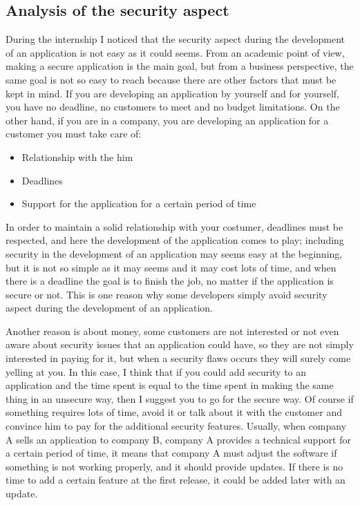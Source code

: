\subsection{Analysis of the security aspect}
During the internship I noticed that the security aspect during the development of an application is not easy as it could seems.\newline
From an academic point of view, making a secure application is the main goal, but from a business perspective, the same goal is not so easy to reach because there are other factors that must be kept in mind.\newline
If you are developing an application by yourself and for yourself, you have no deadline, no customers to meet and no budget limitations.\newline
On the other hand, if you are in a company, you are developing an application for a customer you must take care of:
\begin{itemize}
	\item Relationship with the him
	\item Deadlines
	\item Support for the application for a certain period of time
\end{itemize}

In order to maintain a solid relationship with your costumer, deadlines must be respected, and here the development of the application comes to play; including security in the development of an application may seems easy at the beginning, but it is not so simple as it may seems and it may cost lots of time, and when there is a deadline the goal is to finish the job, no matter if the application is secure or not.\newline
This is one reason why some developers simply avoid security aspect during the development of an application.\newline

Another reason is about money, some customers are not interested or not even aware about security issues that an application could have, so they are not simply interested in paying for it, but when a security flaws occurs they will surely come yelling at you.\newline
In this case, I think that if you could add security to an application and the time spent is equal to the time spent in making the same thing in an unsecure way, then I suggest you to go for the secure way.\newline
Of course if something requires lots of time, avoid it or talk about it with the customer and convince him to pay for the additional security features.\newline
Usually, when company A sells an application to company B, company A provides a technical support for a certain period of time, it means that company A must adjust the software if something is not working properly, and it should provide updates.
If there is no time to add a certain feature at the first release, it could be added later with an update.\newline

